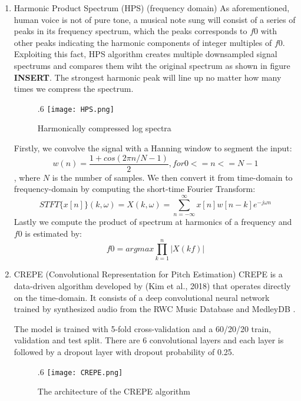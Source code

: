 \begin{enumerate}
	\item Harmonic Product Spectrum (HPS) (frequency domain)
	As aforementioned, human voice is not of pure tone, a musical note sung will consist of a series of peaks in its frequency spectrum,
	which the peaks corresponds to $f0$ with other peaks indicating the harmonic components of integer multiples of $f0$. 
	Exploiting this fact, HPS algorithm creates multiple downsampled signal spectrums and compares them wiht the original spectrum as shown in figure 
	\textbf{INSERT}. The strongest harmonic peak will line up no matter how many times we compress the spectrum.
	
	\begin{figure}{.6\textwidth}
		\texttt{[image: HPS.png]}
		\caption{Harmonically compressed log spectra \cite{HPS}}
	\end{figure}
	
	Firstly, we convolve the signal with a Hanning window to segment the input:
	\[w(n) = \frac{1+cos(2\pi n/N-1)}{2}, for 0<= n<= N-1\], where $N$ is the number of samples.
	We then convert it from time-domain to frequency-domain by computing the short-time Fourier Transform:
	\[STFT \{x[n]\}(k,\omega) = X(k,\omega )= \sum _{n=-\infty }^{\infty }x[n]w[n-k]e^{-j\omega n}\]
	Lastly we compute the product of spectrum at harmonics of a frequency and $f0$ is estimated by:
	\[f0 = argmax\prod_{k=1}^{n}|X(kf)|\] 

	\item CREPE (Convolutional Representation for Pitch Estimation)
	CREPE is a data-driven algorithm developed by (Kim et al., 2018) that operates directly on the time-domain.
	It consists of a deep convolutional neural network trained by synthesized audio from the RWC Music Database \cite{rwcdb}
	and MedleyDB \cite{medleydb}. %

	The model is trained with 5-fold cross-validation and a 60/20/20 train, validation and test split.
	There are 6 convolutional layers and each layer is followed by a dropout layer with dropout probability of 0.25. 

	\begin{figure}{.6\textwidth}
		\texttt{[image: CREPE.png]}
		\caption{The architecture of the CREPE algorithm \cite{CREPE}}
	\end{figure}


\end{enumerate}



